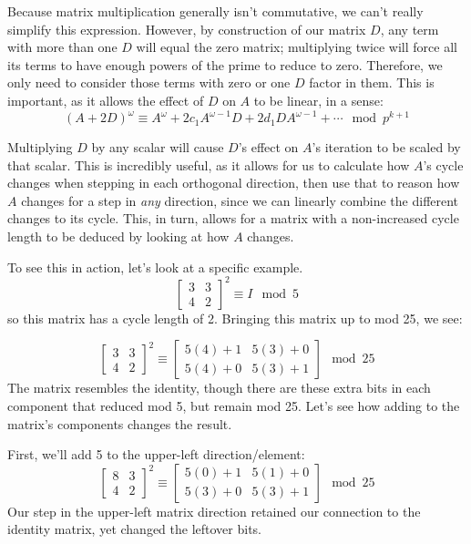 \documentclass[a4paper, 12pt, reqno]{amsart}
\begin{document}
			Because matrix multiplication generally isn't commutative, we can't really simplify this expression. However,
			by construction of our matrix $D$, any term with more than one $D$ will equal the zero matrix; multiplying
			twice will force all its terms to have enough powers of the prime to reduce to zero. Therefore, we only need
			to consider those terms with zero or one $D$ factor in them. This is important, as it allows the effect of
			$D$ on $A$ to be linear, in a sense:
			\[
				(A+2D)^{\omega} \equiv A^{\omega} + 2c_{1}A^{\omega-1}D + 2d_{1}DA^{\omega-1} + \cdots \mod{p^{k+1}}
			\]
			
			Multiplying $D$ by any scalar will cause $D$'s effect on $A$'s iteration to be scaled by that scalar. This is
			incredibly useful, as it allows for us to calculate how $A$'s cycle changes when stepping in each orthogonal
			direction, then use that to reason how $A$ changes for a step in \emph{any} direction, since we can linearly 
			combine the different changes to its cycle. This, in turn, allows for a matrix with a non-increased cycle 
			length to be deduced by looking at how $A$ changes.
			
			To see this in action, let's look at a specific example.
			\[
				\begin{bmatrix}
					3 & 3 \\
					4 & 2
				\end{bmatrix}^2 \equiv I \mod{5}
			\]
			so this matrix has a cycle length of 2. Bringing this matrix up to mod 25, we see:
			
			\[
				\begin{bmatrix}
					3 & 3 \\
					4 & 2
				\end{bmatrix}^2 \equiv 
				\begin{bmatrix}
					5(4) + 1 & 5(3) + 0 \\
					5(4) + 0 & 5(3) + 1
				\end{bmatrix} \mod{25}
			\]
			The matrix resembles the identity, though there are these extra bits in each component that reduced
			mod 5, but remain mod 25. Let's see how adding to the matrix's components changes the result.
			
			First, we'll add 5 to the upper-left direction/element:
			\[
				\begin{bmatrix}
					8 & 3 \\
					4 & 2
				\end{bmatrix}^2 \equiv 
				\begin{bmatrix}
					5(0) + 1 & 5(1) + 0 \\
					5(3) + 0 & 5(3) + 1
				\end{bmatrix} \mod{25}
			\]
			Our step in the upper-left matrix direction retained our connection to the identity matrix, yet changed
			the leftover bits.
			
\end{document}

